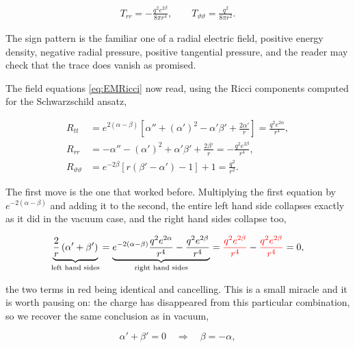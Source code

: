         \begin{align*}
            T_{rr} = -\frac{q^2e^{2\beta}}{8\pi r^4}, \qquad T_{\vartheta\vartheta} = \frac{q^2}{8\pi r^2}.
        \end{align*}

        The sign pattern is the familiar one of a radial electric field, positive energy density, negative radial pressure, positive tangential pressure, and the reader may check that the trace does vanish as promised.

        The field equations \ref{eq:EMRicci} now read, using the Ricci components computed for the Schwarzschild ansatz,

        \begin{align}\label{eq:RNFieldEqs}
            R_{tt} &= e^{2(\alpha-\beta)}\left[\alpha'' + (\alpha')^2 - \alpha'\beta' + \frac{2\alpha'}{r}\right] = \frac{q^2e^{2\alpha}}{r^4},\\
            R_{rr} &= -\alpha'' - (\alpha')^2 + \alpha'\beta' + \frac{2\beta'}{r} = -\frac{q^2e^{2\beta}}{r^4},\nonumber\\
            R_{\vartheta\vartheta} &= e^{-2\beta}\left[r\left(\beta'-\alpha'\right)-1\right] + 1 = \frac{q^2}{r^2}.\nonumber
        \end{align}

        The first move is the one that worked before. Multiplying the first equation by $e^{-2(\alpha-\beta)}$ and adding it to the second, the entire left hand side collapses exactly as it did in the vacuum case, and the right hand sides collapse too,

        \begin{align*}
            \underbrace{\frac{2}{r}\left(\alpha'+\beta'\right)}_{\text{left hand sides}} = \underbrace{e^{-2(\alpha-\beta)}\frac{q^2e^{2\alpha}}{r^4} - \frac{q^2e^{2\beta}}{r^4}}_{\text{right hand sides}} = {\color{red}\frac{q^2e^{2\beta}}{r^4}} - {\color{red}\frac{q^2e^{2\beta}}{r^4}} = 0,
        \end{align*}

        the two terms in red being identical and cancelling. This is a small miracle and it is worth pausing on: the charge has disappeared from this particular combination, so we recover the same conclusion as in vacuum,

        \begin{equation}\label{eq:RNAlphaBeta}
            \alpha' + \beta' = 0 \quad\Longrightarrow\quad \beta = -\alpha,
        \end{equation}

